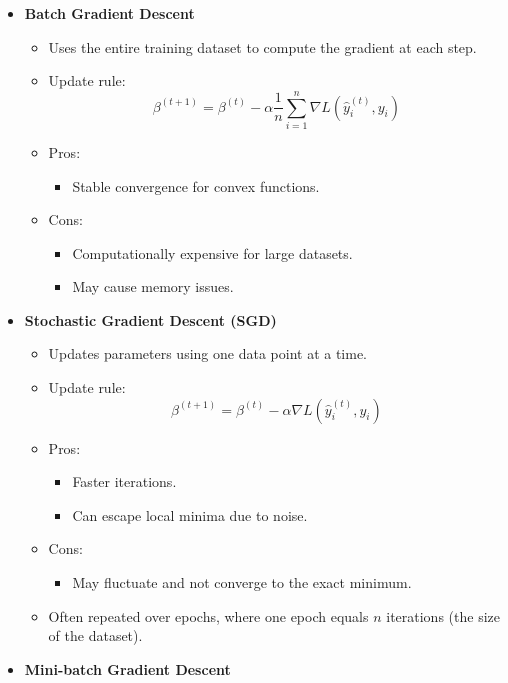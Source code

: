 \documentclass{article}
\begin{document}
\begin{itemize}
    \item \textbf{Batch Gradient Descent}
    \begin{itemize}
        \item Uses the entire training dataset to compute the gradient at each step.
        \item Update rule:
        \[
        \beta^{(t+1)} = \beta^{(t)} - \alpha \frac{1}{n} \sum_{i=1}^{n} \nabla L(\hat{y}_i^{(t)}, y_i)
        \]
        \item Pros:
        \begin{itemize}
            \item Stable convergence for convex functions.
        \end{itemize}
        \item Cons:
        \begin{itemize}
            \item Computationally expensive for large datasets.
            \item May cause memory issues.
        \end{itemize}
    \end{itemize}
    \item \textbf{Stochastic Gradient Descent (SGD)}
    \begin{itemize}
        \item Updates parameters using one data point at a time.
        \item Update rule:
        \[
        \beta^{(t+1)} = \beta^{(t)} - \alpha \nabla L(\hat{y}_i^{(t)}, y_i)
        \]
        \item Pros:
        \begin{itemize}
            \item Faster iterations.
            \item Can escape local minima due to noise.
        \end{itemize}
        \item Cons:
        \begin{itemize}
            \item May fluctuate and not converge to the exact minimum.
        \end{itemize}
        \item Often repeated over epochs, where one epoch equals $n$ iterations (the size of the dataset).
    \end{itemize}
    \item \textbf{Mini-batch Gradient Descent}

\end{itemize}
\end{document}
